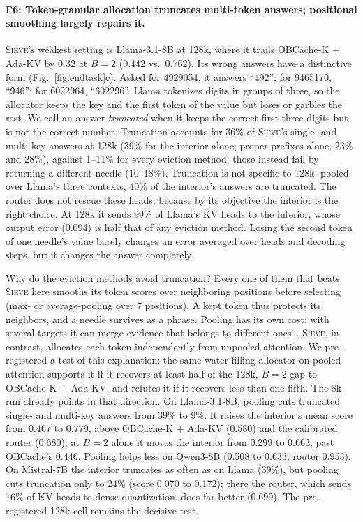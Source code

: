 \documentclass{article}
\newif\ifshowtbd \showtbdtrue
\newcommand{\tbd}[1]{\ifshowtbd{\color{tbdcol}\textbf{TBD}~#1}\else\ifhmode\unskip\fi\fi}
\newif\ifshowest \showesttrue
\DeclareRobustCommand{\est}[1]{\ifshowest{\color{estcol}#1}\else---\fi}
\DeclareRobustCommand{\estonly}[1]{\ifshowest#1\else\ifhmode\unskip\fi\fi}
\newcommand{\sieve}{\textsc{Sieve}}
\theoremstyle{definition}
\begin{document}
\paragraph{F6: Token-granular allocation truncates multi-token answers; positional smoothing largely repairs it.}
\sieve{}'s weakest setting is Llama-3.1-8B at 128k, where it trails OBCache-K + Ada-KV by $0.32$ at $B=2$ (0.442 vs.\ 0.762).  Its wrong answers have a distinctive form (Fig.~\ref{fig:endtask}c).  Asked for 4929054, it answers ``492''; for 9465170, ``946''; for 6022964, ``602296''.  Llama tokenizes digits in groups of three, so the allocator keeps the key and the first token of the value but loses or garbles the rest.  We call an answer \emph{truncated} when it keeps the correct first three digits but is not the correct number.  Truncation accounts for 36\% of \sieve{}'s single- and multi-key answers at 128k (39\% for the interior alone; proper prefixes alone, 23\% and 28\%), against 1--11\% for every eviction method; those instead fail by returning a different needle (10--18\%).  Truncation is not specific to 128k: pooled over Llama's three contexts, 40\% of the interior's answers are truncated.  The router does not rescue these heads, because by its objective the interior is the right choice.  At 128k it sends 99\% of Llama's KV heads to the interior, whose output error (0.094) is half that of any eviction method.  Losing the second token of one needle's value barely changes an error averaged over heads and decoding steps, but it changes the answer completely.

Why do the eviction methods avoid truncation?  Every one of them that beats \sieve{} here smooths its token scores over neighboring positions before selecting (max- or average-pooling over 7 positions).  A kept token thus protects its neighbors, and a needle survives as a phrase.  Pooling has its own cost: with several targets it can merge evidence that belongs to different ones~\citep{zhang2026fixedcontract}.  \sieve{}, in contrast, allocates each token independently from unpooled attention.  We pre-registered a test of this explanation: the same water-filling allocator on pooled attention supports it if it recovers at least half of the 128k, $B=2$ gap to OBCache-K + Ada-KV, and refutes it if it recovers less than one fifth.  The 8k run already points in that direction.  On Llama-3.1-8B, pooling cuts truncated single- and multi-key answers from 39\% to 9\%.  It raises the interior's mean score from 0.467 to 0.779, above OBCache-K + Ada-KV (0.580) and the calibrated router (0.680); at $B=2$ alone it moves the interior from 0.299 to 0.663, past OBCache's 0.446.  Pooling helps less on Qwen3-8B (0.508 to 0.633; router 0.953).  On Mistral-7B the interior truncates as often as on Llama (39\%), but pooling cuts truncation only to 24\% (score 0.070 to 0.172); there the router, which sends 16\% of KV heads to dense quantization, does far better (0.699).  The pre-registered 128k cell remains the decisive test.
\end{document}
